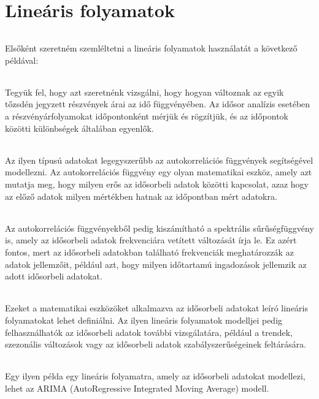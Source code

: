 \documentclass[11pt,a4paper]{article}
\begin{document}
		\part{Lineáris folyamatok}
			\paragraph{}
				Elsőként szeretném szemléltetni a lineáris folyamatok használatát a következő példával:
			\paragraph{}
				Tegyük fel, hogy azt szeretnénk vizsgálni, hogy hogyan változnak az egyik tőzsdén jegyzett részvények árai az idő függvényében. Az idősor analízis esetében a részvényárfolyamokat időpontonként mérjük és rögzítjük, és az időpontok közötti különbségek általában egyenlők.
			\paragraph{}
				Az ilyen típusú adatokat legegyszerűbb az autokorrelációs függvények segítségével modellezni. Az autokorrelációs függvény egy olyan matematikai eszköz, amely azt mutatja meg, hogy milyen erős az idősorbeli adatok közötti kapcsolat, azaz hogy az előző adatok milyen mértékben hatnak az időpontban mért adatokra.
			\paragraph{}
				Az autokorrelációs függvényekből pedig kiszámítható a spektrális sűrűségfüggvény is, amely az idősorbeli adatok frekvenciára vetített változását írja le. Ez azért fontos, mert az idősorbeli adatokban található frekvenciák meghatározzák az adatok jellemzőit, például azt, hogy milyen időtartamú ingadozások jellemzik az adott idősorbeli adatokat.
			\paragraph{}
				Ezeket a matematikai eszközöket alkalmazva az idősorbeli adatokat leíró lineáris folyamatokat lehet definiálni. Az ilyen lineáris folyamatok modelljei pedig felhasználhatók az idősorbeli adatok további vizsgálatára, például a trendek, szezonális változások vagy az idősorbeli adatok szabályszerűségeinek feltárására.
			\paragraph{}
				Egy ilyen példa egy lineáris folyamatra, amely az idősorbeli adatokat modellezi, lehet az ARIMA (AutoRegressive Integrated Moving Average) modell.
\end{document}
